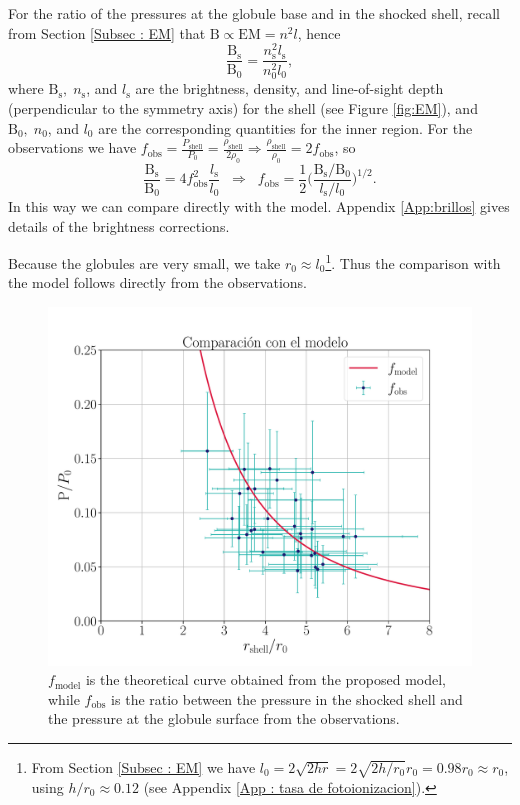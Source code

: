 \documentclass{book}
\begin{document}
For the ratio of the pressures at the globule base and in the shocked
shell, recall from Section \ref{Subsec : EM} that
$\mathrm{B}\propto \mathrm{EM}=n^2l$, hence
\begin{equation}
\frac{\mathrm{B_\mathrm{s}}}{\mathrm{B_0}}=\frac{n_\mathrm{s}^2l_\mathrm{s}}{n_0^2l_0},
\end{equation}
where $\mathrm{B_\mathrm{s}}, \; n_\mathrm{s}$, and $l_\mathrm{s}$ are
the brightness, density, and line-of-sight depth (perpendicular to the
symmetry axis) for the shell (see Figure \ref{fig:EM}), and
$\mathrm{B_0}, \; n_0$, and $l_0$ are the corresponding quantities for
the inner region. For the observations we have
$f_\mathrm{obs} =
\frac{P_\mathrm{shell}}{P_0}=\frac{\rho_\mathrm{shell}}{2\rho_0}
\Rightarrow \frac{\rho_\mathrm{shell}}{\rho_0}=2f_\mathrm{obs}$, so
\begin{equation}
\frac{\mathrm{B_\mathrm{s}}}{\mathrm{B_0}}=4f_\mathrm{obs}^2\frac{l_\mathrm{s}}{l_0}
\;\;\Rightarrow\;\; f_\mathrm{obs}= \frac{1}{2}\Big(\frac{\mathrm{B_\mathrm{s}}/\mathrm{B_0}}{l_\mathrm{s}/l_0}\Big)^{1/2}.
\end{equation}
In this way we can compare directly with the model. Appendix
\ref{App:brillos} gives details of the brightness corrections.

Because the globules are very small, we take
$r_0\approx l_0$\footnote{From Section \ref{Subsec : EM} we have
  $l_0=2\sqrt{2hr}=2\sqrt{2h/r_0}r_0=0.98 r_0\approx r_0$, using
  $h/r_0\approx0.12$ (see Appendix \ref{App : tasa de
    fotoionizacion}).}. Thus the comparison with the model follows
directly from the observations.

\begin{figure}[htb]
    \centering
    \includegraphics[width=\textwidth]{imagenes_corregidas/Model.pdf}
    \caption{$f_\mathrm{model}$ is the theoretical curve obtained from
      the proposed model, while $f_\mathrm{obs}$ is the ratio between
      the pressure in the shocked shell and the pressure at the
      globule surface from the observations.}
    \label{Resultados_modelo}
\end{figure}
\end{document}
